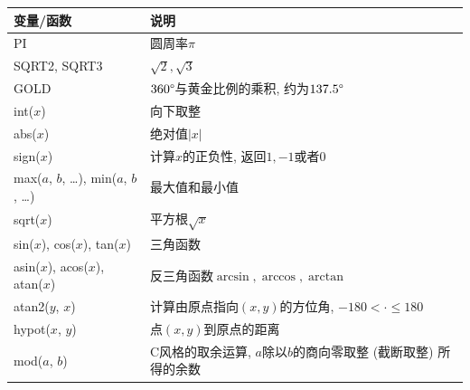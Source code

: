 \begin{center}
  \begin{xltabular}{\textwidth}{XX}
    \toprule
    变量/函数                                  &
    说明                                         \\

    \midrule
    PI                                         &
    圆周率$\pi$                                  \\

    SQRT2, SQRT3                               &
    $\sqrt2, \sqrt3$                             \\

    GOLD                                       &
    $360\degree$与黄金比例的乘积,
    约为$137.5\degree$                           \\

    int($x$)                                   &
    向下取整                                     \\

    abs($x$)                                 &
    绝对值$|x|$                                  \\

    sign($x$) &
    计算$x$的正负性, 返回$1,-1$或者$0$ \\

    max($a$, $b$, \dots), min($a$, $b$, \dots) &
    最大值和最小值                               \\

    sqrt($x$)                                  &
    平方根$\sqrt x$                              \\

    sin($x$), cos($x$), tan($x$)               &
    三角函数                                     \\

    asin($x$), acos($x$), atan($x$)            &
    反三角函数$\arcsin,\arccos,\arctan$          \\

    atan2($y$, $x$)                            &
    计算由原点指向$(x,y)$的方位角,
    $-180 < \cdot \le 180$           \\

    hypot($x$, $y$) &
    点$(x,y)$到原点的距离 \\

    mod($a$, $b$)                              &
    C风格的取余运算, $a$除以$b$的商向零取整
    (截断取整) 所得的余数                        \\


\end{xltabular}
\end{center}
